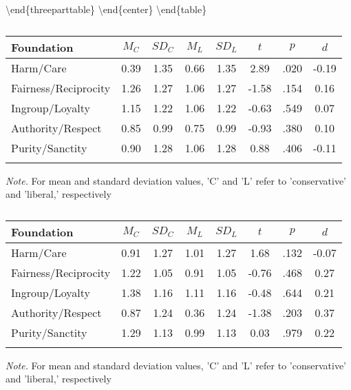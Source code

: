 \documentclass[english,,man]{apa6}
\begin{document}
\textbackslash{}end\{threeparttable\}
\textbackslash{}end\{center\}
\textbackslash{}end\{table\}

\begin{table}[tbp]
\begin{center}
\begin{threeparttable}
\caption{\label{tab:exp2-table_kav}}
\begin{tabular}{lccccccc}
\toprule
Foundation & $M_C$ & $SD_C$ & $M_L$ & $SD_L$ & $t$ & $p$ & $d$\\
\midrule
Harm/Care & 0.39 & 1.35 & 0.66 & 1.35 & 2.89 & .020 & -0.19\\
Fairness/Reciprocity & 1.26 & 1.27 & 1.06 & 1.27 & -1.58 & .154 & 0.16\\
Ingroup/Loyalty & 1.15 & 1.22 & 1.06 & 1.22 & -0.63 & .549 & 0.07\\
Authority/Respect & 0.85 & 0.99 & 0.75 & 0.99 & -0.93 & .380 & 0.10\\
Purity/Sanctity & 0.90 & 1.28 & 1.06 & 1.28 & 0.88 & .406 & -0.11\\
\bottomrule
\addlinespace
\end{tabular}
\begin{tablenotes}[para]
\normalsize{\textit{Note.} For mean and standard deviation values, 'C' and 'L' refer to 'conservative' and 'liberal,' respectively}
\end{tablenotes}
\end{threeparttable}
\end{center}
\end{table}

\begin{table}[tbp]
\begin{center}
\begin{threeparttable}
\caption{\label{tab:exp2-table_gs}}
\begin{tabular}{lccccccc}
\toprule
Foundation & $M_C$ & $SD_C$ & $M_L$ & $SD_L$ & $t$ & $p$ & $d$\\
\midrule
Harm/Care & 0.91 & 1.27 & 1.01 & 1.27 & 1.68 & .132 & -0.07\\
Fairness/Reciprocity & 1.22 & 1.05 & 0.91 & 1.05 & -0.76 & .468 & 0.27\\
Ingroup/Loyalty & 1.38 & 1.16 & 1.11 & 1.16 & -0.48 & .644 & 0.21\\
Authority/Respect & 0.87 & 1.24 & 0.36 & 1.24 & -1.38 & .203 & 0.37\\
Purity/Sanctity & 1.29 & 1.13 & 0.99 & 1.13 & 0.03 & .979 & 0.22\\
\bottomrule
\addlinespace
\end{tabular}
\begin{tablenotes}[para]
\normalsize{\textit{Note.} For mean and standard deviation values, 'C' and 'L' refer to 'conservative' and 'liberal,' respectively}
\end{tablenotes}
\end{threeparttable}
\end{center}
\end{table}
\end{document}
